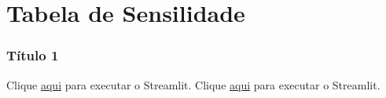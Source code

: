 \section{Tabela de Sensilidade} \label{FormProb}

\begin{frame}[c]\frametitle{Título 1}

  Clique \href{run:../streamlitSenbilidade.sh}{aqui} para executar o Streamlit.
  Clique \href{http://localhost:8503}{aqui} para executar o Streamlit.
\end{frame}
